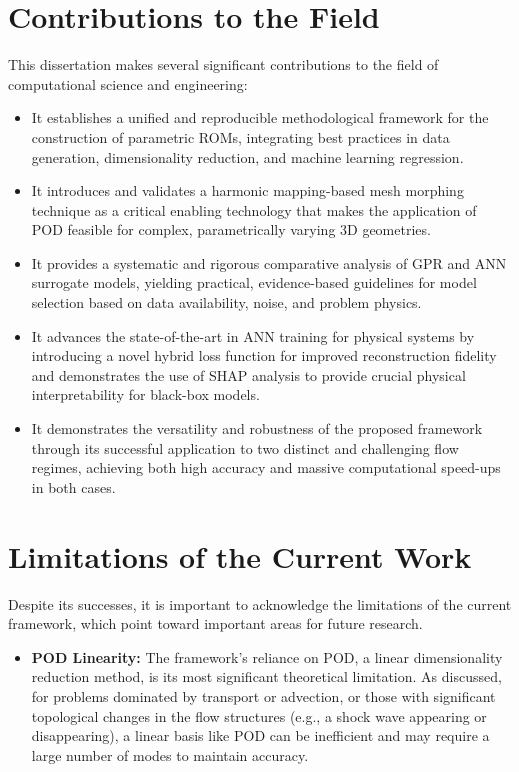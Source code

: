 \documentclass[dsc, EN]{ufabcFHZh}
\begin{document}
{\section{Contributions to the Field}

This dissertation makes several significant contributions to the field of computational science and engineering:

\begin{itemize}
    \item It establishes a unified and reproducible methodological framework for the construction of parametric ROMs, integrating best practices in data generation, dimensionality reduction, and machine learning regression.
    \item It introduces and validates a harmonic mapping-based mesh morphing technique as a critical enabling technology that makes the application of POD feasible for complex, parametrically varying 3D geometries.
    \item It provides a systematic and rigorous comparative analysis of GPR and ANN surrogate models, yielding practical, evidence-based guidelines for model selection based on data availability, noise, and problem physics.
    \item It advances the state-of-the-art in ANN training for physical systems by introducing a novel hybrid loss function for improved reconstruction fidelity and demonstrates the use of SHAP analysis to provide crucial physical interpretability for black-box models.
    \item It demonstrates the versatility and robustness of the proposed framework through its successful application to two distinct and challenging flow regimes, achieving both high accuracy and massive computational speed-ups in both cases.
\end{itemize}


\section{Limitations of the Current Work}

Despite its successes, it is important to acknowledge the limitations of the current framework, which point toward important areas for future research.


\begin{itemize}
    \item \textbf{POD Linearity:} The framework's reliance on POD, a linear dimensionality reduction method, is its most significant theoretical limitation. As discussed, for problems dominated by transport or advection, or those with significant topological changes in the flow structures (e.g., a shock wave appearing or disappearing), a linear basis like POD can be inefficient and may require a large number of modes to maintain accuracy.


\end{itemize}}
\end{document}
